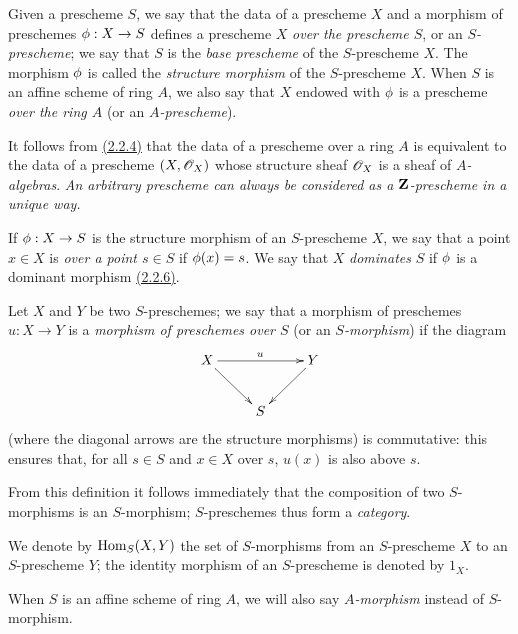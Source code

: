 \begin{defn}[2.5.1]
\label{defn-1.2.5.1}
Given a prescheme $S$, we say that the data of a
prescheme $X$ and a morphism of preschemes $\phi:X\to S$ defines a
prescheme $X$ {\em over the prescheme $S$}, or an {\em $S$-prescheme}; we say
that $S$ is the {\em base prescheme} of the $S$-prescheme $X$. The morphism
$\phi$ is called the {\em structure morphism} of the $S$-prescheme $X$.
When $S$ is an affine scheme of ring $A$, we also say that $X$ endowed with
$\phi$ is a prescheme {\em over the ring $A$} (or an {\em $A$-prescheme}).
\end{defn}

It follows from \hyperref[prop-1.2.2.4]{(2.2.4)} that the data of a prescheme over a ring $A$ is
equivalent to the data of a prescheme $(X,\mathscr{O}_X)$ whose structure sheaf $\mathscr{O}_X$ is
a sheaf of {\em $A$-algebras}. {\em An arbitrary prescheme can always be
considered as a $\mathbf{Z}$-prescheme in a unique way.}

If $\phi:X\to S$ is the structure morphism of an $S$-prescheme $X$, we
say that a point $x\in X$ is {\em over a point $s\in S$} if $\phi(x)=s$. We
say that $X$ {\em dominates} $S$ if $\phi$ is a dominant morphism \hyperref[env-1.2.2.6]{(2.2.6)}.

\begin{env}[2.5.2]
\label{env-1.2.5.2}
Let $X$ and $Y$ be two $S$-preschemes; we say that a morphism
of preschemes $u:X\to Y$ is a {\em morphism of preschemes over $S$} (or
an {\em $S$-morphism}) if the diagram
\[
  \xymatrix{
    X \ar[rr]^u \ar[dr] & & Y\ar[dl]\\
    & S &
  }
\]
(where the diagonal arrows are the structure morphisms) is
commutative: this ensures that, for all $s\in S$ and $x\in X$ over $s$, $u(x)$
is also above $s$.
\end{env}

From this definition it follows immediately that the composition of two
$S$-morphisms is an $S$-morphism; $S$-preschemes thus form a {\em category}.

We denote by ${\mathop{\mathrm{Hom}}\nolimits}_S(X,Y)$ the set of $S$-morphisms from an $S$-prescheme $X$ to
an $S$-prescheme $Y$; the identity morphism of an $S$-prescheme is denoted by
$1_X$.

When $S$ is an affine scheme of ring $A$, we will also say {\em $A$-morphism}
instead of $S$-morphism.

